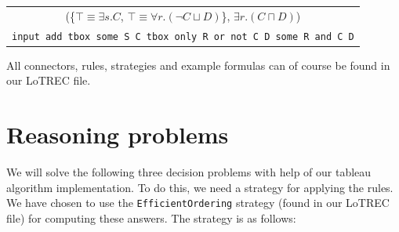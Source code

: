 \documentclass[11pt]{article} %
\begin{document}
\begin{table}[h]
\begin{center}
\begin{tabular}{c}
(\{$\top \equiv \exists s.C$, $\top \equiv \forall r.(\neg C \sqcup D)$\}, $\exists r.(C \sqcap D)$)\\
\texttt{input add tbox some S C tbox only R or not C D some R and C D}\\
\end{tabular}
\end{center}
\end{table}

All connectors, rules, strategies and example formulas can of course be found in our LoTREC file.

\section{Reasoning problems}
\label{sec:reasoning}

We will solve the following three decision problems with help of our tableau algorithm implementation. To do this, we need a strategy for applying the rules. We have chosen to use the \texttt{EfficientOrdering} strategy (found in our LoTREC file) for computing these answers. The strategy is as follows:
\end{document}
